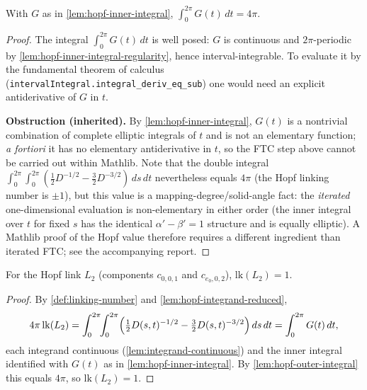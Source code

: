 \begin{lemma}
    \label{lem:hopf-outer-integral}
    With $G$ as in \cref{lem:hopf-inner-integral},
    $\displaystyle\int_0^{2\pi} G(t)\,dt = 4\pi$.
\end{lemma}
\begin{proof}
    The integral $\int_0^{2\pi}G(t)\,dt$ is well posed: $G$ is continuous and
    $2\pi$-periodic by \cref{lem:hopf-inner-integral-regularity}, hence
    interval-integrable. To evaluate it by the fundamental theorem of calculus
    (\texttt{intervalIntegral.integral\_deriv\_eq\_sub}) one would need an explicit
    antiderivative of $G$ in $t$.

    \textbf{Obstruction (inherited).} By \cref{lem:hopf-inner-integral}, $G(t)$ is a
    nontrivial combination of complete elliptic integrals of $t$ and is not an
    elementary function; \emph{a fortiori} it has no elementary antiderivative in $t$,
    so the FTC step above cannot be carried out within Mathlib. Note that the double
    integral $\int_0^{2\pi}\!\int_0^{2\pi}(\tfrac12 D^{-1/2}-\tfrac32 D^{-3/2})\,ds\,dt$
    nevertheless equals $4\pi$ (the Hopf linking number is $\pm1$), but this value is
    a mapping-degree/solid-angle fact: the \emph{iterated} one-dimensional evaluation
    is non-elementary in either order (the inner integral over $t$ for fixed $s$ has
    the identical $\alpha'-\beta'=1$ structure and is equally elliptic). A Mathlib
    proof of the Hopf value therefore requires a different ingredient than iterated
    FTC; see the accompanying report.
\end{proof}

\begin{lemma}
    \label{lem:hopf-linking-value}
    For the Hopf link $L_2$ (components $c_{0,0,1}$ and $c_{e_0,0,2}$),
    $\mathrm{lk}(L_2) = 1$.
\end{lemma}
\begin{proof}
    By \cref{def:linking-number} and \cref{lem:hopf-integrand-reduced},
    \[
        4\pi\,\mathrm{lk}(L_2)=\int_0^{2\pi}\!\!\int_0^{2\pi}
            \Bigl(\tfrac12 D(s,t)^{-1/2}-\tfrac32 D(s,t)^{-3/2}\Bigr)\,ds\,dt
        =\int_0^{2\pi} G(t)\,dt ,
    \]
    each integrand continuous (\cref{lem:integrand-continuous}) and the inner
    integral identified with $G(t)$ as in \cref{lem:hopf-inner-integral}. By
    \cref{lem:hopf-outer-integral} this equals $4\pi$, so
    $\mathrm{lk}(L_2)=1$.
\end{proof}

